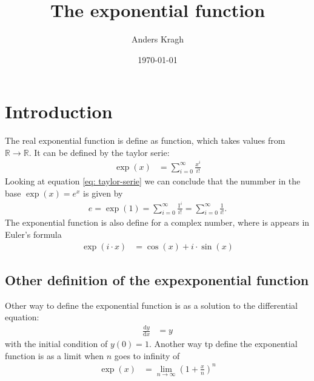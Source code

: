\documentclass[12pt, twocolumn, a4paper]{article}
\title{The exponential function}
\author{Anders Kragh}
\date{\today}
\begin{document}
\maketitle
\section{Introduction}
The real exponential function is define as  function, which takes values from $ \mathbb{R} \to \mathbb{R}$. It can be defined by the taylor serie:
\begin{align}
\exp \left( x \right) &= \sum_{i=0}^{\infty}  \frac{x^i}{i!} \label{eq: taylor-serie}\tag{$\star$}
\end{align}
Looking at equation \eqref{eq: taylor-serie} we can conclude that the nummber in the base $\exp \left(x \right) = e^{x}$ is given by
\begin{align}
e  = \exp \left(1 \right) = \sum_{i=0}^{\infty}  \frac{1^i}{i!} = \sum_{i=0}^{\infty}  \frac{1}{i!}. \label{eq: e}
\end{align}
The exponential function is also define for a complex number, where is appears in Euler's formula 
\begin{align}
\exp \left( i\cdot x \right) &= \cos \left(x \right) + i \cdot \sin \left( x \right) \label{eq: euler}
\end{align}
\subsection{Other definition of the expexponential function}
Other way to define the exponential function is as a solution to the differential equation:
\begin{align}
\frac{\text{d}y}{\text{d}x} &= y \label{eq: diff}
\end{align}
with the initial condition of $y\left(0 \right) = 1$.
Another way tp define the exponential function is as a limit when $n$ goes to infinity of
\begin{align}
\exp \left( x \right) &= \lim_{n\to \infty} \left(1+\frac{x}{n}\right)^{n} \label{eq: lim}
\end{align}
\end{document}
